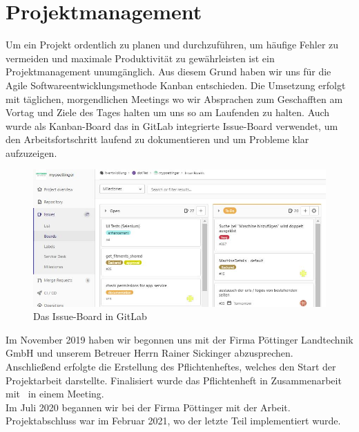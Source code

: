\chapter{Projektmanagement}
Um ein Projekt ordentlich zu planen und durchzuführen, um häufige Fehler zu vermeiden und maximale Produktivität zu gewährleisten ist ein Projektmanagement unumgänglich. Aus diesem Grund haben wir uns für die Agile Softwareentwicklungsmethode Kanban entschieden. Die Umsetzung erfolgt mit täglichen, morgendlichen Meetings wo wir Absprachen zum Geschafften am Vortag und Ziele des Tages halten um uns so am Laufenden zu halten. Auch wurde als Kanban-Board das in GitLab integrierte Issue-Board verwendet, um den Arbeitsfortschritt laufend zu dokumentieren und um Probleme klar aufzuzeigen.\\

\begin{figure}[h]
	\centerline{
		\includegraphics[width=1\textwidth, frame]{./grafiken/GitLab_issue_Board.JPG}
	}
	\vskip0pt
	\caption{Das Issue-Board in GitLab}
\end{figure}


Im November 2019 haben wir begonnen uns mit der Firma Pöttinger Landtechnik GmbH und unserem Betreuer Herrn Rainer Sickinger abzusprechen.\\
Anschließend erfolgte die Erstellung des Pflichtenheftes, welches den Start der Projektarbeit darstellte. Finalisiert wurde das Pflichtenheft in Zusammenarbeit mit \ThPartnerPersonName \ in einem Meeting.\\
Im Juli 2020 begannen wir bei der Firma Pöttinger mit der Arbeit. Projektabschluss war im Februar 2021, wo der letzte Teil implementiert wurde.

